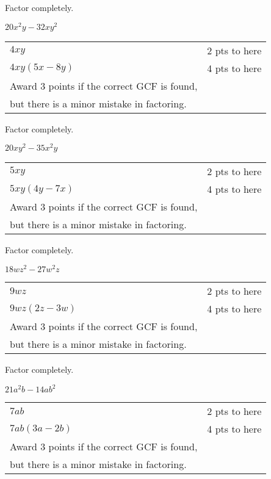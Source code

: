 {
	Factor completely.\par
	$20x^2y-32xy^2 $
}
{
	\begin{tabular}{l r}
	$4xy$ & 2 pts to here\\
	$4xy(5x-8y)$ & 4 pts to here\\
	Award 3 points if the correct GCF is found, \\
	but there is a minor mistake in factoring. \\
	\end{tabular}
}

{
	Factor completely.\par
	$20xy^2-35x^2y$
}
{
	\begin{tabular}{l r}
	$5xy$ & 2 pts to here\\
	$5xy(4y-7x)$   & 4 pts to here\\
	Award 3 points if the correct GCF is found, \\
	but there is a minor mistake in factoring. 
	\end{tabular}
}

{
	Factor completely.\par
	$18wz^2-27w^2z$
}
{
	\begin{tabular}{l r}
	$9wz$  & 2 pts to here \\
	$9wz(2z-3w)$ 	  & 4 pts to here\\
	Award 3 points if the correct GCF is found, \\
	but there is a minor mistake in factoring. \\
	\end{tabular}
}

{
	Factor completely.\par
	$21a^2b-14ab^2$
}
{
	\begin{tabular}{l r}
	$7ab$    & 2 pts to here \\
	$7ab(3a-2b)$     & 4 pts to here \\
	Award 3 points if the correct GCF is found, \\
	but there is a minor mistake in factoring. \\
	\end{tabular}
}
